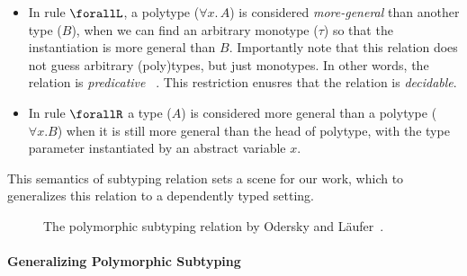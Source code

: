 \begin{itemize}
  \item In rule $\forallL$, a polytype ($\forall x.\, A$) is considered \emph{more-general}
        than another type ($B$), when we can find an arbitrary monotype ($\tau$)
        so that the instantiation is more general than $B$.
        Importantly note that this relation does not guess arbitrary (poly)types,
        but just monotypes. In other words, the relation is \emph{predicative}~
        \cite{Martin-Lof-1972}.
        This restriction enusres that the relation is \emph{decidable}.
  \item In rule  $\forallR$ a type ($A$) is considered more general than a polytype ($\forall x. B$)
        when it is still more general than the head of polytype, with the type
        parameter instantiated by an abstract variable $x$.
\end{itemize}

This semantics of subtyping relation sets a scene for our work, which
to generalizes this relation to a dependently typed setting.

\begin{figure}
\centering


\caption{The polymorphic subtyping relation by Odersky and L\"aufer~\cite{odersky1996putting}.}
\label{fig:polymorphic-subtyping}
\end{figure}


\paragraph{Generalizing Polymorphic Subtyping}
\label{sec:polymorphic-subtyping}

